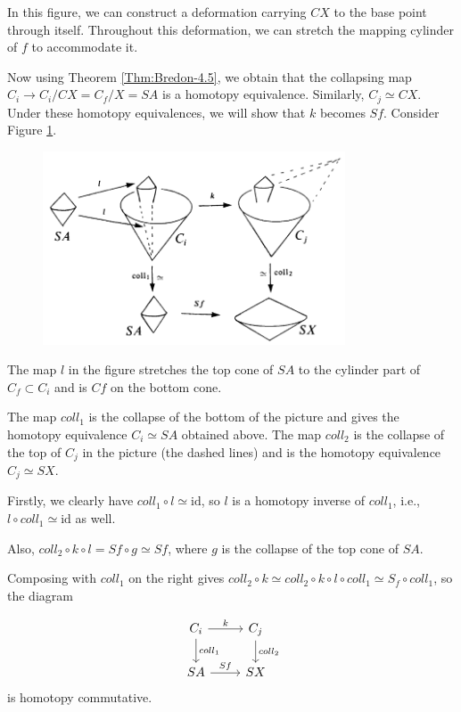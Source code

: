 \documentclass[reqno]{amsart}
\theoremstyle{definition}
\theoremstyle{remark}
\newcommand{\id}{{\mathrm{id}}}
\begin{document}
In this figure, we can construct a deformation
carrying $CX$ to the base point through itself.
Throughout this deformation, we can stretch the
mapping cylinder of $f$ to accommodate it.

Now using Theorem \ref{Thm:Bredon-4.5}, we obtain
that the collapsing map
$C_i \to C_i / CX = C_f / X = SA$ is a homotopy equivalence.
Similarly, $C_j \simeq CX$. Under these
homotopy equivalences, we will show that
$k$ becomes $Sf$. Consider
Figure \ref{fig:Figures-DJIOWJA-png}.

\begin{figure}[htpb]
    \centering
    \includegraphics[width=0.8\textwidth]{Figures/DJIOWJA.png}
    \caption{}
    \label{fig:Figures-DJIOWJA-png}
\end{figure}

The map $l$ in the figure stretches the top
cone of $SA$ to the cylinder part of
$C_f \subset C_i$ and
is $Cf$ on the bottom cone.

The map  $coll_1$ is the collapse of the
bottom of the picture and gives the homotopy equivalence
$C_i \simeq SA$ obtained above.
The map $coll_2$ is the collapse of the top of $C_j$ in
the picture (the dashed lines) and is the
homotopy equivalence $C_j \simeq SX$.

Firstly, we clearly have $coll_1 \circ l \simeq \id$, so
$l$ is a homotopy inverse of $coll_1$, i.e.,
 $l \circ coll_1 \simeq \id$ as well.

 Also, $coll_2 \circ k \circ l = Sf \circ g \simeq
 Sf$, where $g$ is the collapse
 of the top cone of $SA$.

 Composing with $coll_1$ on the right gives
 $coll_2 \circ k \simeq 
 coll_2 \circ k \circ l \circ coll_1
 \simeq S_f \circ coll_1$, so the diagram
 
 \begin{equation*}
 \begin{tikzcd}
     C_i \ar[r, "k"] \ar[d, "coll_1"] & C_j \ar[d, "coll_2"] \\
     SA \ar[r, "Sf"] & SX
 \end{tikzcd}
 \end{equation*}
 is homotopy commutative.
\end{document}
